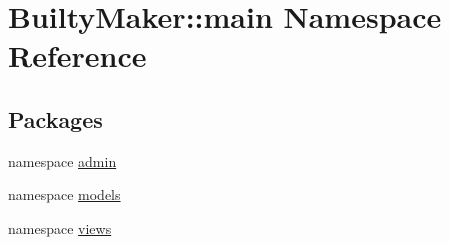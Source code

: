 \hypertarget{namespaceBuiltyMaker_1_1main}{\section{\-Builty\-Maker\-:\-:main \-Namespace \-Reference}
\label{namespaceBuiltyMaker_1_1main}
}
\subsection*{\-Packages}
\begin{DoxyCompactItemize}
\item 
namespace \hyperlink{namespaceBuiltyMaker_1_1main_1_1admin}{admin}
\item 
namespace \hyperlink{namespaceBuiltyMaker_1_1main_1_1models}{models}
\item 
namespace \hyperlink{namespaceBuiltyMaker_1_1main_1_1views}{views}
\end{DoxyCompactItemize}
